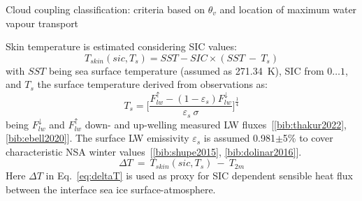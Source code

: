 \documentclass[portrate,a0paper,fontscale=0.4,margin=1cm]{baposter}
\begin{document}
\begin{poster}
{\colouredcircle Cloud coupling classification: criteria based on $\theta_v$ and location of maximum water vapour transport\\
\begin{minipage}{0.9\textwidth}
	\centering
	\label{fig:cop-dec}
\end{minipage}


\colouredcircle Skin temperature is estimated considering SIC values:
\begin{equation}
	T_{skin}(sic, T_s) = SST - SIC\times(SST~-~T_s)
	\label{eq:Tskin}
\end{equation}
with $SST$ being sea surface temperature (assumed as 271.34~K), SIC from $0\dots1$, and $T_s$ the surface temperature derived from observations as:
\[
	T_s = \Big[ \frac{F_{lw}^{\uparrow} - (1-\varepsilon_s)F_{lw}^{\downarrow}}{\varepsilon_s~\sigma} \Big]^{\frac{1}{4}}
\]
being $F_{lw}^{\downarrow}$ and $F_{lw}^{\uparrow}$ down- and up-welling measured LW fluxes~[\ref{bib:thakur2022}, \ref{bib:ebell2020}]. The surface LW emissivity $\varepsilon_s$ is assumed 0.981$\pm$5\% to cover characteristic NSA winter values~[\ref{bib:shupe2015}, \ref{bib:dolinar2016}].
\begin{equation}
	\Delta T~=~T_{skin}(sic, T_s)~-~T_{2m}
	\label{eq:deltaT}
\end{equation}
Here $\Delta T$ in Eq.~\ref{eq:deltaT} is used as proxy for SIC dependent sensible heat flux between the interface sea ice surface-atmosphere. %

} %


\end{poster}
\end{document}

